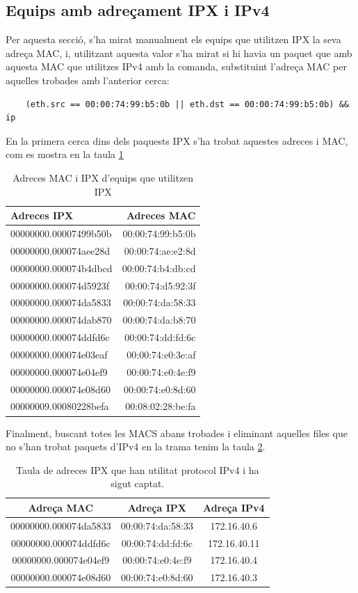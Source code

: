 \documentclass{article}
\begin{document}
\subsection{Equips amb adreçament IPX i IPv4}
Per aquesta secció, s'ha mirat manualment els equips que utilitzen IPX 
la seva adreça MAC, i, utilitzant aquesta valor s'ha mirat si hi havia un 
paquet que amb aquesta MAC que utilitzes IPv4 amb la comanda, substituint
l'adreça MAC per aquelles trobades amb l'anterior cerca:\\
\begin{lstlisting}
	(eth.src == 00:00:74:99:b5:0b || eth.dst == 00:00:74:99:b5:0b) && ip
\end{lstlisting}
En la primera cerca dins dels paquests IPX s'ha trobat aquestes adreces i MAC,
com es mostra en la taula \ref{ipx:mac}
\begin{table}[!h]
\centering
\begin{tabular}{|l|r|}
\hline
Adreces IPX &Adreces MAC\\
\hline
00000000.00007499b50b &00:00:74:99:b5:0b\\
\hline
00000000.000074aee28d &00:00:74:ae:e2:8d\\
\hline
00000000.000074b4dbcd &00:00:74:b4:db:cd\\
\hline
00000000.000074d5923f &00:00:74:d5:92:3f\\
\hline
00000000.000074da5833 &00:00:74:da:58:33\\
\hline
00000000.000074dab870 &00:00:74:da:b8:70\\
\hline
00000000.000074ddfd6c &00:00:74:dd:fd:6c\\
\hline
00000000.000074e03eaf &00:00:74:e0:3e:af\\
\hline
00000000.000074e04ef9 &00:00:74:e0:4e:f9\\
\hline
00000000.000074e08d60 &00:00:74:e0:8d:60\\
\hline
00000009.00080228befa &00:08:02:28:be:fa\\
\hline
\end{tabular}
\caption{Adreces MAC i IPX d'equips que utilitzen IPX}
\label{ipx:mac}
\end{table}
Finalment, buscant totes les MACS abans trobades i eliminant aquelles 
files que no s'han trobat paquets d'IPv4 en la trama tenim la taula \ref{ipx:ipv4}.
\begin{table}[!h]
\centering
\begin{tabular}{ |c|c|c| }
\hline
Adreça MAC &Adreça IPX &Adreça IPv4\\
\hline
00000000.000074da5833 &00:00:74:da:58:33 &172.16.40.6\\
\hline
00000000.000074ddfd6c &00:00:74:dd:fd:6c &172.16.40.11\\
\hline
00000000.000074e04ef9 &00:00:74:e0:4e:f9 &172.16.40.4\\
\hline
00000000.000074e08d60 &00:00:74:e0:8d:60 &172.16.40.3\\
\hline
\end{tabular}
\caption{Taula de adreces IPX que han utilitat protocol IPv4 i ha sigut captat.}
\label{ipx:ipv4}
\end{table}
\end{document}

